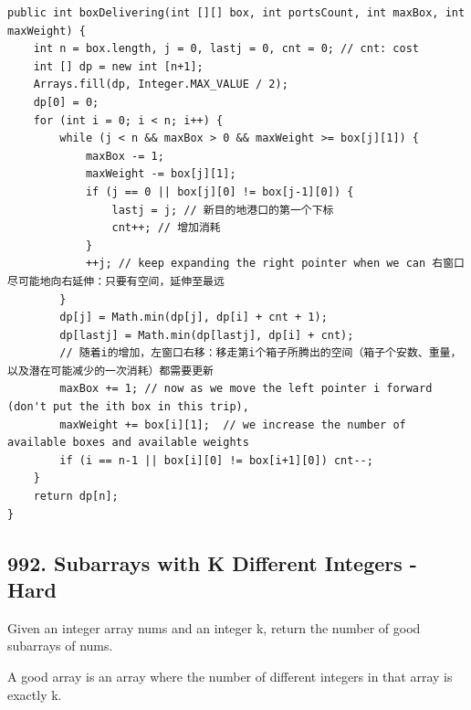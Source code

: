 \documentclass[9pt, b5paaper]{book}
\begin{document}
\begin{enumerate}
\begin{verbatim}
public int boxDelivering(int [][] box, int portsCount, int maxBox, int maxWeight) {
    int n = box.length, j = 0, lastj = 0, cnt = 0; // cnt: cost
    int [] dp = new int [n+1];
    Arrays.fill(dp, Integer.MAX_VALUE / 2);
    dp[0] = 0;
    for (int i = 0; i < n; i++) {
        while (j < n && maxBox > 0 && maxWeight >= box[j][1]) {
            maxBox -= 1;
            maxWeight -= box[j][1];
            if (j == 0 || box[j][0] != box[j-1][0]) {
                lastj = j; // 新目的地港口的第一个下标
                cnt++; // 增加消耗
            }
            ++j; // keep expanding the right pointer when we can 右窗口尽可能地向右延伸：只要有空间，延伸至最远
        }
        dp[j] = Math.min(dp[j], dp[i] + cnt + 1);
        dp[lastj] = Math.min(dp[lastj], dp[i] + cnt);
        // 随着i的增加，左窗口右移：移走第i个箱子所腾出的空间（箱子个安数、重量，以及潜在可能减少的一次消耗）都需要更新
        maxBox += 1; // now as we move the left pointer i forward (don't put the ith box in this trip),
        maxWeight += box[i][1];  // we increase the number of available boxes and available weights
        if (i == n-1 || box[i][0] != box[i+1][0]) cnt--;
    }
    return dp[n];
}
\end{verbatim}
\end{enumerate}

\subsection{992. Subarrays with K Different Integers - Hard}
\label{sec-5-0-15}
Given an integer array nums and an integer k, return the number of good subarrays of nums.

A good array is an array where the number of different integers in that array is exactly k.
\end{document}
